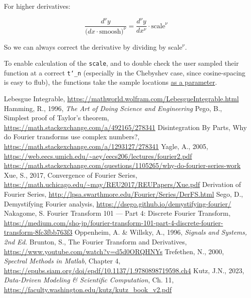 \documentclass[10pt]{article}
\begin{document}
For higher derivatives:

$$\frac{d^\nu y}{\big( dx \cdot \text{smoosh})^\nu} = \frac{d^\nu y}{dx^\nu} \cdot \text{scale}^\nu$$

So we can always correct the derivative by dividing by scale$^\nu$.\newline

To enable calculation of the \texttt{scale}, and to double check the user sampled their function at a correct \texttt{t\char`_n} (especially in the Chebyshev case, since cosine-spacing is easy to flub), the functions take the sample locations \href{https://pavelkomarov.com/spectral-derivatives/specderiv.html}{as a parameter}.

\printendnotes

\begin{thebibliography}{99} %
\raggedright
{}
	Lebesgue Integrable, \url{https://mathworld.wolfram.com/LebesgueIntegrable.html}
	Hamming, R., 1996, \textit{The Art of Doing Science and Engineering}
	Pego, B., Simplest proof of Taylor's theorem, \url{https://math.stackexchange.com/a/492165/278341}
	Disintegration By Parts, Why do Fourier transforms use complex numbers?, \url{https://math.stackexchange.com/a/1293127/278341}
	Yagle, A., 2005, \url{https://web.eecs.umich.edu/~aey/eecs206/lectures/fourier2.pdf}
	\url{https://math.stackexchange.com/questions/1105265/why-do-fourier-series-work}
	Xue, S., 2017, Convergence of Fourier Series, \url{https://math.uchicago.edu/~may/REU2017/REUPapers/Xue.pdf}
	Derivation of Fourier Series, \url{http://lpsa.swarthmore.edu/Fourier/Series/DerFS.html}
	Sego, D., Demystifying Fourier analysis, \url{https://dsego.github.io/demystifying-fourier/}
	Nakagome, S. Fourier Transform 101 — Part 4: Discrete Fourier Transform, \url{https://medium.com/sho-jp/fourier-transform-101-part-4-discrete-fourier-transform-8fc3fbb763f3}
	Oppenheim, A. \& Willsky, A., 1996, \textit{Signals and Systems, 2nd Ed.}
	Brunton, S., The Fourier Transform and Derivatives, \url{https://www.youtube.com/watch?v=d5d0ORQHNYs}
	Trefethen, N., 2000, \textit{Spectral Methods in Matlab}, Chapter 4, \url{https://epubs.siam.org/doi/epdf/10.1137/1.9780898719598.ch4}
	Kutz, J.N., 2023, \textit{Data-Driven Modeling \& Scientific Computation}, Ch. 11, \url{https://faculty.washington.edu/kutz/kutz_book_v2.pdf}

\end{thebibliography}
\end{document}
